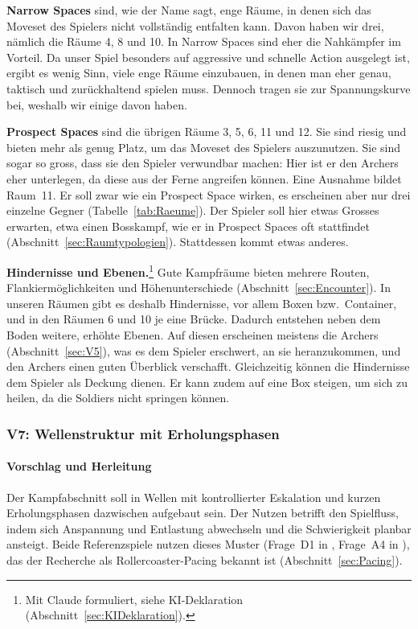 \documentclass[../Main.tex]{subfiles}
\begin{document}
\textbf{Narrow Spaces} sind, wie der Name sagt, enge Räume, in denen sich das Moveset des Spielers nicht vollständig entfalten kann. Davon haben wir drei, nämlich die Räume 4, 8 und 10. In Narrow Spaces sind eher die Nahkämpfer im Vorteil. Da unser Spiel besonders auf aggressive und schnelle Action ausgelegt ist, ergibt es wenig Sinn, viele enge Räume einzubauen, in denen man eher genau, taktisch und zurückhaltend spielen muss. Dennoch tragen sie zur Spannungskurve bei, weshalb wir einige davon haben.

\textbf{Prospect Spaces} sind die übrigen Räume 3, 5, 6, 11 und 12. Sie sind riesig und bieten mehr als genug Platz, um das Moveset des Spielers auszunutzen. Sie sind sogar so gross, dass sie den Spieler verwundbar machen: Hier ist er den Archers eher unterlegen, da diese aus der Ferne angreifen können. Eine Ausnahme bildet Raum~11. Er soll zwar wie ein Prospect Space wirken, es erscheinen aber nur drei einzelne Gegner (Tabelle~\ref{tab:Raeume}). Der Spieler soll hier etwas Grosses erwarten, etwa einen Bosskampf, wie er in Prospect Spaces oft stattfindet (Abschnitt~\ref{sec:Raumtypologien}). Stattdessen kommt etwas anderes.

\textbf{Hindernisse und Ebenen.}\footnote{Mit Claude formuliert, siehe KI-Deklaration (Abschnitt~\ref{sec:KIDeklaration}).} Gute Kampfräume bieten mehrere Routen, Flankiermöglichkeiten und Höhenunterschiede (Abschnitt~\ref{sec:Encounter}). In unseren Räumen gibt es deshalb Hindernisse, vor allem Boxen bzw.\ Container, und in den Räumen 6 und 10 je eine Brücke. Dadurch entstehen neben dem Boden weitere, erhöhte Ebenen. Auf diesen erscheinen meistens die Archers (Abschnitt~\ref{sec:V5}), was es dem Spieler erschwert, an sie heranzukommen, und den Archers einen guten Überblick verschafft. Gleichzeitig können die Hindernisse dem Spieler als Deckung dienen. Er kann zudem auf eine Box steigen, um sich zu heilen, da die Soldiers nicht springen können.

\subsubsection{V7: Wellenstruktur mit Erholungsphasen} \label{sec:V7}

\paragraph{Vorschlag und Herleitung}
Der Kampfabschnitt soll in Wellen mit kontrollierter Eskalation und kurzen Erholungsphasen dazwischen aufgebaut sein. Der Nutzen betrifft den Spielfluss, indem sich Anspannung und Entlastung abwechseln und die Schwierigkeit planbar ansteigt. Beide Referenzspiele nutzen dieses Muster (Frage~D1 in , Frage~A4 in ), das der Recherche als Rollercoaster-Pacing bekannt ist (Abschnitt~\ref{sec:Pacing}).
\end{document}
